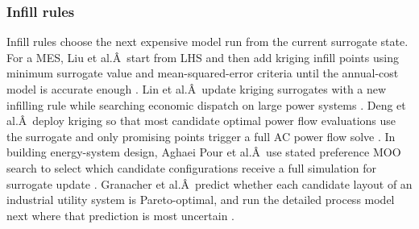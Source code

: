 \subsubsection{Infill rules}

Infill rules choose the next expensive model run from the current
surrogate state. For a MES, Liu et al.Â~start from LHS and then add
kriging infill points using minimum surrogate value and
mean-squared-error criteria until the annual-cost model is accurate
enough \cite{Liu201914569}. Lin et al.Â~update kriging surrogates with a new
infilling rule while searching economic dispatch on large power systems
\cite{Lin2023}. Deng et al.Â~deploy kriging so that most candidate optimal
power flow evaluations use the surrogate and only promising points
trigger a full AC power flow solve \cite{Deng2020831}. In building
energy-system design, Aghaei Pour et al.Â~use stated preference MOO
search to select which candidate configurations receive a full
simulation for surrogate update \cite{Aghaei Pour2022303}. Granacher et
al.Â~predict whether each candidate layout of an industrial utility
system is Pareto-optimal, and run the detailed process model next where
that prediction is most uncertain \cite{Granacher20221573}.


